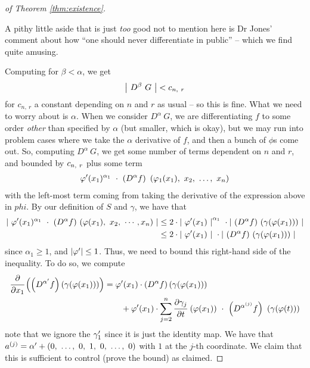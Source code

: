 \begin{proof}[of Theorem \ref{thm:existence}]
    \newpage
    \begin{svgraybox}
      A pithy little aside that is just \emph{too} good not to mention here is Dr Jones' comment about how ``one should never differentiate in public'' -- which we find quite amusing.
    \end{svgraybox}

    Computing for $\beta < \alpha$, we get
      \begin{align*}
        \left\vert \ D^{\beta} \ G \ \right\vert < c_{n, \ r}
      \end{align*}
    for $c_{n, \ r}$ a constant depending on $n$ and $r$ as usual -- so this is fine. What we need to worry about is $\alpha$. When we consider $D^{\alpha} \ G$, we are differentiating $f$ to some order \emph{other} than specified by $\alpha$ (but smaller, which is okay), but we may run into problem cases where we take the $\alpha$ derivative of $f$, and then a bunch of $\phi$s come out. So, computing $D^{\alpha} \ G$, we get some number of terms dependent on $n$ and $r$, and bounded by $c_{n, \ r}$ plus some term
      \begin{align*}
        \varphi^{\prime}(x_1)^{\alpha_1} \ \cdot \ \left( D^{\alpha} f \right) \ (\varphi_1(x_1), \ x_2, \ \hdots, \ x_n)
      \end{align*}
    with the left-most term coming from taking the derivative of the expression above in $phi$. By our definition of $S$ and $\gamma$, we have that
      \begin{align*}
        \left\vert \  \pri{\phi}(x_1)^{\alpha_1} \ \cdot \ (D^{\alpha} f) \ (\phi(x_1), \ x_2, \ \cdots, x_n) \ \right\vert &\leq 2 \cdot \left\vert \ \pri{\phi}(x_1) \ \right\vert^{\alpha_1} \ \cdot \left\vert \ (D^{\alpha} f) \ (\gamma(\phi(x_1))) \ \right\vert \\
                    &\leq 2 \cdot \left\vert \ \pri{\phi}(x_1) \ \right\vert \ \cdot \left\vert \ (D^{\alpha} f) \ (\gamma(\phi(x_1))) \ \right\vert
      \end{align*}
    since $\alpha_1 \geq 1$, and $\vert\varphi^{\prime}\vert \leq 1$. Thus, we need to bound this right-hand side of the inequality. To do so, we compute
      \begin{align}
        \cfrac{\partial}{\partial x_1} \left( \left( D^{\alpha^{\prime}} f \right) \left( \gamma (\varphi(x_1)) \right) \right) &= \varphi^{\prime}(x_1) \cdot \left( D^{\alpha} f \right) \left( \gamma (\varphi(x_1)) \right) \label{eqn:param_deriv_1} \\
        &\quad \quad+ \varphi^{\prime}(x_1) \cdot \sum_{j=2}^{n} \cfrac{\partial \gamma_j}{\partial t} \ (\varphi(x_1)) \ \cdot \ \left( D^{{\alpha}^{(j)}} f \right) \ \left( \gamma(\varphi(t)) \right)
        \label{eqn:param_deriv_2}
      \end{align}
    note that we ignore the $\gamma_1^{\prime}$ since it is just the identity map. We have that $a^{(j)} = \alpha^{\prime} + (0, \ \hdots, \ 0, \ 1, \ 0, \ \hdots, \ 0)$ with $1$ at the $j$-th coordinate. We claim that this is sufficient to control (prove the bound) as claimed.


\end{proof}
